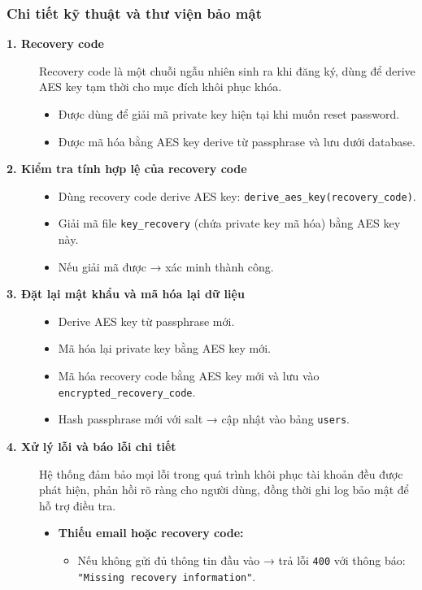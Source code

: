 \subsubsection*{Chi tiết kỹ thuật và thư viện bảo mật}
\begin{description}

    \item[\textbf{1. Recovery code}]
    Recovery code là một chuỗi ngẫu nhiên sinh ra khi đăng ký, dùng để derive AES key tạm thời cho mục đích khôi phục khóa.
    \begin{itemize}
        \item Được dùng để giải mã private key hiện tại khi muốn reset password. 
        \item Được mã hóa bằng AES key derive từ passphrase và lưu dưới database.
    \end{itemize}

    \item[\textbf{2. Kiểm tra tính hợp lệ của recovery code}]
    \begin{itemize}
        \item Dùng recovery code derive AES key: \texttt{derive\_aes\_key(recovery\_code)}.
        \item Giải mã file \texttt{key\_recovery} (chứa private key mã hóa) bằng AES key này.
        \item Nếu giải mã được → xác minh thành công.
    \end{itemize}

    \item[\textbf{3. Đặt lại mật khẩu và mã hóa lại dữ liệu}]
    \begin{itemize}
        \item Derive AES key từ passphrase mới.
        \item Mã hóa lại private key bằng AES key mới.
        \item Mã hóa recovery code bằng AES key mới và lưu vào \texttt{encrypted\_recovery\_code}.
        \item Hash passphrase mới với salt → cập nhật vào bảng \texttt{users}.
    \end{itemize}

    \item[\textbf{4. Xử lý lỗi và báo lỗi chi tiết}]
    Hệ thống đảm bảo mọi lỗi trong quá trình khôi phục tài khoản đều được phát hiện, phản hồi rõ ràng cho người dùng, đồng thời ghi log bảo mật để hỗ trợ điều tra.

    \begin{itemize}
        \item \textbf{Thiếu email hoặc recovery code:}
        \begin{itemize}
            \item Nếu không gửi đủ thông tin đầu vào → trả lỗi \texttt{400} với thông báo: \texttt{"Missing recovery information"}.
        \end{itemize}


\end{itemize}
\end{description}
